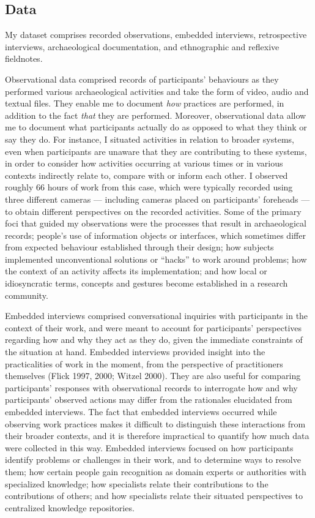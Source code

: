 \documentclass[
]{article}
\begin{document}
\subsection{Data}\label{data}

My dataset comprises recorded observations, embedded interviews,
retrospective interviews, archaeological documentation, and ethnographic
and reflexive fieldnotes.

Observational data comprised records of participants' behaviours as they
performed various archaeological activities and take the form of video,
audio and textual files. They enable me to document \emph{how} practices
are performed, in addition to the fact \emph{that} they are performed.
Moreover, observational data allow me to document what participants
actually do as opposed to what they think or say they do. For instance,
I situated activities in relation to broader systems, even when
participants are unaware that they are contributing to these systems, in
order to consider how activities occurring at various times or in
various contexts indirectly relate to, compare with or inform each
other. I observed roughly 66 hours of work from this case, which were
typically recorded using three different cameras --- including cameras
placed on participants' foreheads --- to obtain different perspectives
on the recorded activities. Some of the primary foci that guided my
observations were the processes that result in archaeological records;
people's use of information objects or interfaces, which sometimes
differ from expected behaviour established through their design; how
subjects implemented unconventional solutions or ``hacks'' to work
around problems; how the context of an activity affects its
implementation; and how local or idiosyncratic terms, concepts and
gestures become established in a research community.

Embedded interviews comprised conversational inquiries with participants
in the context of their work, and were meant to account for
participants' perspectives regarding how and why they act as they do,
given the immediate constraints of the situation at hand. Embedded
interviews provided insight into the practicalities of work in the
moment, from the perspective of practitioners themselves (Flick 1997,
2000; Witzel 2000). They are also useful for comparing participants'
responses with observational records to interrogate how and why
participants' observed actions may differ from the rationales elucidated
from embedded interviews. The fact that embedded interviews occurred
while observing work practices makes it difficult to distinguish these
interactions from their broader contexts, and it is therefore
impractical to quantify how much data were collected in this way.
Embedded interviews focused on how participants identify problems or
challenges in their work, and to determine ways to resolve them; how
certain people gain recognition as domain experts or authorities with
specialized knowledge; how specialists relate their contributions to the
contributions of others; and how specialists relate their situated
perspectives to centralized knowledge repositories.
\end{document}
